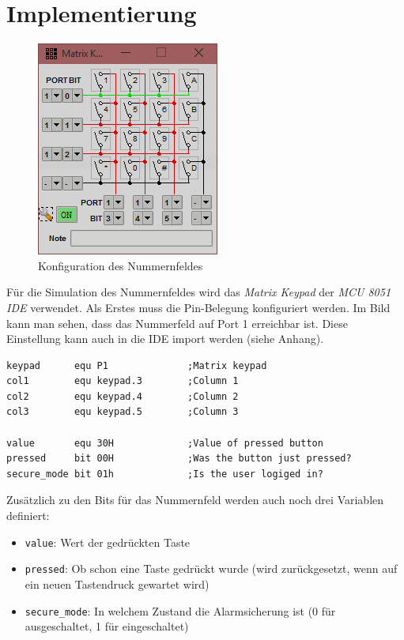 
\chapter{Implementierung}\label{implementierung}

\begin{figure}[htbp]
\centering
\includegraphics{images/keypad-screenshot}
\caption{Konfiguration des Nummernfeldes}
\end{figure}

Für die Simulation des Nummernfeldes wird das \emph{Matrix Keypad} der \emph{MCU 8051 IDE}
verwendet. Als Erstes muss die Pin-Belegung konfiguriert werden. Im Bild kann man sehen, dass das
Nummerfeld auf Port 1 erreichbar ist. Diese Einstellung kann auch in die IDE import werden (siehe
Anhang).

\begin{lstlisting}
keypad      equ P1              ;Matrix keypad
col1        equ keypad.3        ;Column 1
col2        equ keypad.4        ;Column 2
col3        equ keypad.5        ;Column 3

value       equ 30H             ;Value of pressed button
pressed     bit 00H             ;Was the button just pressed?
secure_mode bit 01h             ;Is the user logiged in?
\end{lstlisting}

Zusätzlich zu den Bits für das Nummernfeld werden auch noch drei Variablen definiert:

\begin{itemize}
\item
  \texttt{value}: Wert der gedrückten Taste
\item
  \texttt{pressed}: Ob schon eine Taste gedrückt wurde (wird zurückgesetzt, wenn auf ein neuen
  Tastendruck gewartet wird)
\item
  \texttt{secure_mode}: In welchem Zustand die Alarmsicherung ist (0 für ausgeschaltet, 1 für
  eingeschaltet)
\end{itemize}

